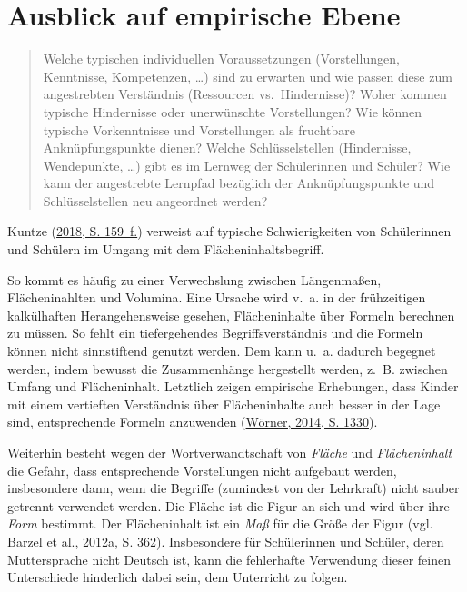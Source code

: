 \documentclass[
]{scrbook}
\theoremstyle{definition}
\theoremstyle{definition}
\theoremstyle{definition}
\theoremstyle{definition}
\theoremstyle{remark}
\begin{document}
\hypertarget{ausblick-auf-empirische-ebene}{%
\section{Ausblick auf empirische Ebene}\label{ausblick-auf-empirische-ebene}}

\begin{quote}
Welche typischen individuellen Voraussetzungen (Vorstellungen, Kenntnisse, Kompetenzen, \ldots) sind zu erwarten und wie passen diese zum angestrebten Verständnis (Ressourcen vs.~Hindernisse)?
Woher kommen typische Hindernisse oder unerwünschte Vorstellungen?
Wie können typische Vorkenntnisse und Vorstellungen als fruchtbare Anknüpfungspunkte dienen?
Welche Schlüsselstellen (Hindernisse, Wendepunkte, \ldots) gibt es im Lernweg der Schülerinnen und Schüler?
Wie kann der angestrebte Lernpfad bezüglich der Anknüpfungspunkte und Schlüsselstellen neu angeordnet werden?
\end{quote}

Kuntze (\protect\hyperlink{ref-Kuntze2018}{2018, S. 159~f.}) verweist auf typische Schwierigkeiten von Schülerinnen und Schülern im Umgang mit dem Flächeninhaltsbegriff.

So kommt es häufig zu einer Verwechslung zwischen Längenmaßen, Flächeninahlten und Volumina. Eine Ursache wird v.~a. in der frühzeitigen kalkülhaften Herangehensweise gesehen, Flächeninhalte über Formeln berechnen zu müssen. So fehlt ein tiefergehendes Begriffsverständnis und die Formeln können nicht sinnstiftend genutzt werden. Dem kann u.~a. dadurch begegnet werden, indem bewusst die Zusammenhänge hergestellt werden, z.~B. zwischen Umfang und Flächeninhalt.
Letztlich zeigen empirische Erhebungen, dass Kinder mit einem vertieften Verständnis über Flächeninhalte auch besser in der Lage sind, entsprechende Formeln anzuwenden (\protect\hyperlink{ref-Worner2014}{Wörner, 2014, S. 1330}).

Weiterhin besteht wegen der Wortverwandtschaft von \emph{Fläche} und \emph{Flächeninhalt} die Gefahr, dass entsprechende Vorstellungen nicht aufgebaut werden, insbesondere dann, wenn die Begriffe (zumindest von der Lehrkraft) nicht sauber getrennt verwendet werden. Die Fläche ist die Figur an sich und wird über ihre \emph{Form} bestimmt. Der Flächeninhalt ist ein \emph{Maß} für die Größe der Figur (vgl. \protect\hyperlink{ref-Barzel2012a}{Barzel et al., 2012a, S. 362}). Insbesondere für Schülerinnen und Schüler, deren Muttersprache nicht Deutsch ist, kann die fehlerhafte Verwendung dieser feinen Unterschiede hinderlich dabei sein, dem Unterricht zu folgen.
\end{document}

